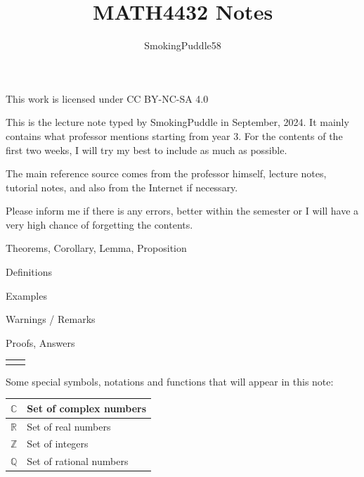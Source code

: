 \documentclass{article}
\title{MATH4432 Notes}
\author{SmokingPuddle58}
\theoremstyle{MyNonumberplain}
\theoremstyle{break}
\newcommand{\R}{\mathbb{R}}
\newcommand{\Q}{\mathbb{Q}}
\newcommand{\Z}{\mathbb{Z}}
\newcommand{\C}{\mathbb{C}}
\theoremstyle{break}
\theoremstyle{break}
\theoremstyle{break}
\begin{document}
\maketitle

\begin{center}
    This work is licensed under CC BY-NC-SA 4.0
\end{center}


\newpage

    This is the lecture note typed by SmokingPuddle in September, 2024. It mainly contains what professor mentions starting from year 3. For the contents of the first two weeks, I will try my best to include as much as possible. 

    The main reference source comes from the professor himself, lecture notes, tutorial notes, and also from the Internet if necessary.

    Please inform me if there is any errors, better within the semester or I will have a very high chance of forgetting the contents. 

    \bigskip


\begin{thmbox}
    Theorems, Corollary, Lemma, Proposition
\end{thmbox}

\begin{defbox}
    Definitions
\end{defbox}

\begin{expbox}
    Examples
\end{expbox}

\begin{warnbox}
    Warnings / Remarks
\end{warnbox}

\begin{prfbox}
    Proofs, Answers
\end{prfbox}

\begin{tabular}{ll}
    &\\
\end{tabular}

Some special symbols, notations and functions that will appear in this note:\bigskip

\begin{center}

    \begin{tabular}{|l|l|}
        \hline
        $\C$ & Set of complex numbers \\ \hline
        $\R$ & Set of real numbers \\ \hline
        $\Z$ & Set of integers \\ \hline
        $\Q$ & Set of rational numbers \\ \hline
    \end{tabular}
\end{center}
\begin{center}
    

\end{center}
\end{document}
